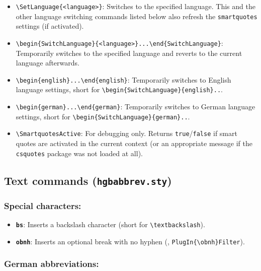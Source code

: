 \documentclass[language=english]{hgbarticle}
\begin{document}
\begin{itemize}
	\item \verb!\SetLanguage{<language>}!:
    Switches to the specified language.
		This and the other language switching commands listed below
		also refresh the \texttt{smartquotes} settings (if activated).
	\item \verb!\begin{SwitchLanguage}{<language>}...\end{SwitchLanguage}!:
    Temporarily switches to the specified language and reverts to the current language 
		afterwards. 
	\item \verb!\begin{english}...\end{english}!:
    Temporarily switches to English language settings, short for
		\verb!\begin{SwitchLanguage}{english}..!.
	\item \verb!\begin{german}...\end{german}!:
    Temporarily switches to German language settings, short for
		\verb!\begin{SwitchLanguage}{german}..!.
	\item \verb!\SmartquotesActive!:
		For debugging only. Returns \texttt{true}/\texttt{false} if smart quotes are activated in
		the current context (or an appropriate message if the \texttt{csquotes} package was not loaded at all).
\end{itemize}


\subsection{Text commands (\texttt{hgbabbrev.sty})}

\subsubsection*{Special characters:}

\begin{itemize}
    \item \textbf{\texttt{{\bs}bs}}: Inserts a backslash character (short for
    \verb!\textbackslash!).
    \item \textbf{\texttt{{\bs}obnh}}: Inserts an optional break with no
    hyphen (\eg, \verb!PlugIn{\obnh}Filter!).
\end{itemize}


\subsubsection*{German abbreviations:}
\end{document}
